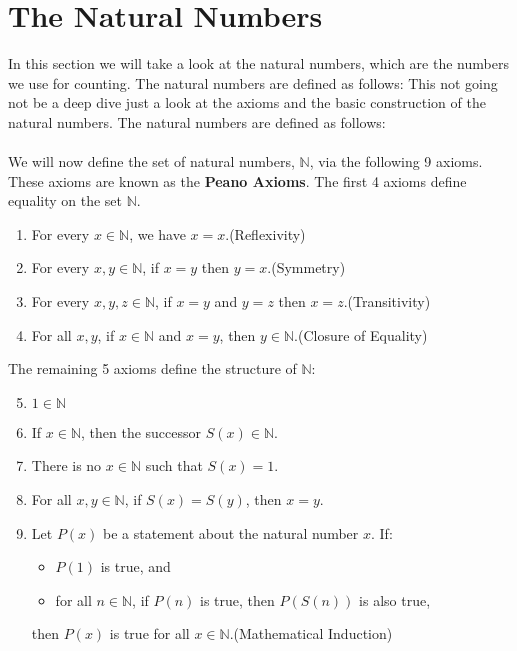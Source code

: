 \newpage
\section{The Natural Numbers}

In this section we will take a look at the natural numbers, which are the numbers we use for counting. The natural numbers are defined as follows:
This not going not be a deep dive just a look at the axioms and the basic construction of the natural numbers. The natural numbers are defined as follows:
\\\\
We will now define the set of natural numbers, \( \mathbb{N} \), via the following 9 axioms. These axioms are known as the \textbf{Peano Axioms}. The first 4 axioms define equality on the set \( \mathbb{N} \).

\begin{enumerate}[label=\Roman*.]
	\item For every \( x \in \mathbb{N} \), we have \( x = x \).\hfill (Reflexivity)
	\item For every \( x, y \in \mathbb{N} \), if \( x = y \) then \( y = x \).\hfill (Symmetry)
	\item For every \( x, y, z \in \mathbb{N} \), if \( x = y \) and \( y = z \) then \( x = z \).\hfill (Transitivity)
	\item For all \( x, y \), if \( x \in \mathbb{N} \) and \( x = y \), then \( y \in \mathbb{N} \).\hfill (Closure of Equality)
\end{enumerate}

The remaining 5 axioms define the structure of \( \mathbb{N} \):

\begin{enumerate}[label=\Roman*.]
	\setcounter{enumi}{4}
	\item \( 1 \in \mathbb{N} \)
	\item If \( x \in \mathbb{N} \), then the successor \( S(x) \in \mathbb{N} \).
	\item There is no \( x \in \mathbb{N} \) such that \( S(x) = 1 \).
	\item For all \( x, y \in \mathbb{N} \), if \( S(x) = S(y) \), then \( x = y \).
	\item Let \( P(x) \) be a statement about the natural number \( x \). If:
		\begin{itemize}
			\item \( P(1) \) is true, and
			\item for all \( n \in \mathbb{N} \), if \( P(n) \) is true, then \( P(S(n)) \) is also true,
		\end{itemize}
		then \( P(x) \) is true for all \( x \in \mathbb{N} \).\hfill (Mathematical Induction)
\end{enumerate}

